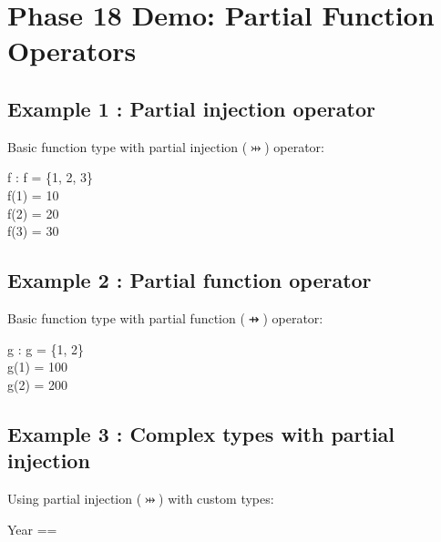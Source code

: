 \documentclass[a4paper,10pt,fleqn]{article}
\begin{document}
\section*{Phase 18 Demo: Partial Function Operators}

\subsection*{Example 1 : Partial injection operator}

\noindent Basic function type with partial injection ($\pinj$) operator:

\bigskip

\begin{axdef}
f : \nat \pinj \nat
\where
\dom f = \{1, 2, 3\} \\
f(1) = 10 \\
f(2) = 20 \\
f(3) = 30
\end{axdef}

\subsection*{Example 2 : Partial function operator}

\noindent Basic function type with partial function ($\pfun$) operator:

\bigskip

\begin{axdef}
g : \nat \pfun \nat
\where
\dom g = \{1, 2\} \\
g(1) = 100 \\
g(2) = 200
\end{axdef}

\subsection*{Example 3 : Complex types with partial injection}

\noindent Using partial injection ($\pinj$) with custom types:

\bigskip

\begin{zed}
Year == \nat
\end{zed}
\end{document}

